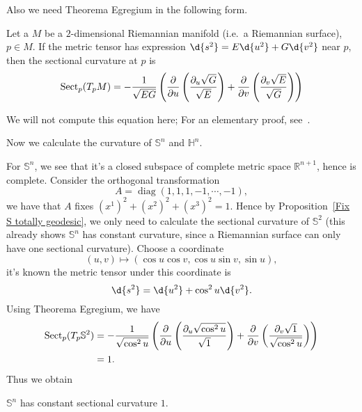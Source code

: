 Also we need Theorema Egregium in the following form.

\begin{thm}
    Let a $M$ be a $2$-dimensional Riemannian manifold (i.e.\ a Riemannian surface), $p\in M$.
    If the metric tensor has expression $\d{s^2}=E\d{u^2}+G\d{v^2}$ near $p$, then the sectional curvature at $p$ is
    \[\operatorname{Sect}_p(T_pM)=-\frac{1}{\sqrt{EG}}\left(\frac{\partial}{\partial{u}}\left(\frac{\partial_u\sqrt{G}}{\sqrt{E}}\right)+\frac{\partial}{\partial{v}}\left(\frac{\partial_v\sqrt{E}}{\sqrt{G}}\right)\right)\]
\end{thm}

We will not compute this equation here;
For an elementary proof, see~\cite[Equation~2.131]{Toponogov}.

Now we calculate the curvature of $\mathbb{S}^n$ and $\mathbb{H}^n$.

For $\mathbb{S}^n$, we see that it's a closed subspace of complete metric space $\mathbb{R}^{n+1}$, hence is complete.
Consider the orthogonal transformation 
\[A=\operatorname{diag}(1,1,1,-1,\cdots,-1),\]
we have that $A$ fixes $(x^1)^2+(x^2)^2+(x^3)^2=1$.
Hence by Proposition~\ref{Fix S totally geodesic}, we only need to calculate the sectional curvature of $\mathbb{S}^2$ (this already shows $\mathbb{S}^n$ has constant curvature, since a Riemannian surface can only have one sectional curvature).
Choose a coordinate
\[(u,v)\mapsto(\cos{u}\cos{v},\cos{u}\sin{v},\sin{u}),\]
it's known the metric tensor under this coordinate is
\[\d{s^2}=\d{u^2}+\cos^2{u}\d{v^2}.\]
Using Theorema Egregium, we have
\begin{align*}
    \operatorname{Sect}_p(T_p\mathbb{S}^2)&=-\frac{1}{\sqrt{\cos^2{u}}}\left(\frac{\partial{}}{\partial{u}}\left(\frac{\partial_u\sqrt{\cos^2{u}}}{\sqrt{1}}\right)+\frac{\partial{}}{\partial{v}}\left(\frac{\partial_v\sqrt{1}}{\sqrt{\cos^2{u}}}\right)\right)\\
    &=1.
\end{align*}
Thus we obtain
\begin{prop}
    $\mathbb{S}^n$ has constant sectional curvature $1$.
\end{prop}


